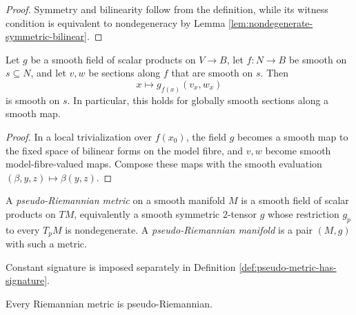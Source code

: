 \begin{proof}

\sketch Symmetry and bilinearity follow from the definition, while its witness
condition is equivalent to nondegeneracy by Lemma
\ref{lem:nondegenerate-symmetric-bilinear}.
\end{proof}

\begin{lemma}
\label{lem:pseudo-metric-pairing-smooth}





Let $g$ be a smooth field of scalar products on $V\to B$, let $f\colon N\to B$
be smooth on $s\subseteq N$, and let $v,w$ be sections along $f$ that are smooth
on $s$. Then
\[
x\longmapsto g_{f(x)}(v_x,w_x)
\]
is smooth on $s$. In particular, this holds for globally smooth sections along a
smooth map.
\end{lemma}

\begin{proof}

\sketch In a local trivialization over $f(x_0)$, the field $g$ becomes a smooth map
to the fixed space of bilinear forms on the model fibre, and $v,w$ become smooth
model-fibre-valued maps. Compose these maps with the smooth evaluation
$(\beta,y,z)\mapsto\beta(y,z)$.
\end{proof}

\begin{definition}
\label{def:pseudo-riemannian-metric}





A \emph{pseudo-Riemannian metric} on a smooth manifold $M$ is a smooth field of
scalar products on $TM$, equivalently a smooth symmetric $2$-tensor $g$ whose
restriction $g_p$ to every $T_pM$ is nondegenerate. A \emph{pseudo-Riemannian
manifold} is a pair $(M,g)$ with such a metric.
\end{definition}

Constant signature is imposed separately in Definition
\ref{def:pseudo-metric-has-signature}.

\begin{proposition}
\label{prop:riemannian-is-pseudo-riemannian}





Every Riemannian metric is pseudo-Riemannian.
\end{proposition}

